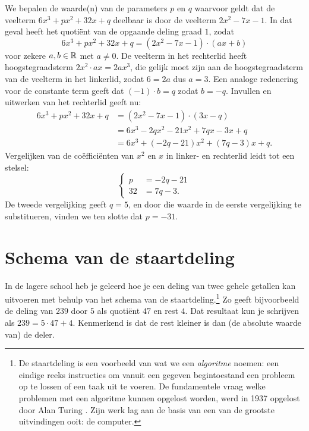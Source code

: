 \documentclass{ximera}
\begin{document}
\begin{example} 
We bepalen de waarde(n) van de parameters $p$ en $q$ waarvoor geldt dat de veelterm $6x^3+px^2+32x+q$ deelbaar is door de veelterm $2x^2-7x-1$. In dat geval heeft het quoti\"ent van de opgaande deling graad $1$, zodat 
\[
6x^3+px^2+32x+q = (2x^2-7x-1)\cdot (ax+b)
\]
voor zekere $a,b \in \mathbb{R}$ met $a \neq 0$. De veelterm in het rechterlid heeft hoogstegraadsterm $2x^2 \cdot ax = 2ax^3$, die gelijk moet zijn aan de hoogstegraadsterm van de veelterm in het linkerlid, zodat $6 = 2a$ dus $a = 3$. Een analoge redenering voor de constante term geeft dat $(-1) \cdot b = q$ zodat $b = -q$. Invullen en uitwerken van het rechterlid geeft nu:
\begin{align*}
6x^3+px^2+32x+q 
& = (2x^2-7x-1)\cdot (3x-q) \\
& = 6x^3 - 2qx^2 - 21x^2 + 7qx - 3x + q \\
& = 6x^3 + (-2q-21)x^2 + (7q-3)x+q.
\end{align*}
Vergelijken van de co\"effici\"enten van $x^2$ en $x$ in linker- en rechterlid leidt tot een stelsel:
\[
\left\{ 
\begin{aligned}
p & = -2q - 21 \\
32 & = 7q - 3. 
\end{aligned}
\right.
\]
De tweede vergelijking geeft $q = 5$, en door die waarde in de eerste vergelijking te substitueren, vinden we ten slotte dat $p = -31$.  
\end{example} 

\section{Schema van de staartdeling}

In de lagere school heb je geleerd hoe je een deling van twee gehele getallen kan uitvoeren met behulp van het schema van de staartdeling.\footnote{De staartdeling is een voorbeeld van wat we een {\em algoritme} noemen: een eindige reeks instructies om vanuit een gegeven begintoestand een probleem op te lossen of een taak uit te voeren. De fundamentele vraag welke problemen met een algoritme kunnen opgelost worden, werd in 1937 opgelost door Alan Turing \cite{Turing}. Zijn werk lag aan de basis van een van de grootste uitvindingen ooit: de computer.} Zo geeft bijvoorbeeld de deling van $239$ door $5$ als quoti\"ent $47$ en rest $4$. Dat resultaat kun je schrijven als $239 = 5 \cdot 47 + 4$. Kenmerkend is dat de rest kleiner is dan (de absolute waarde van) de deler. 
\end{document}
